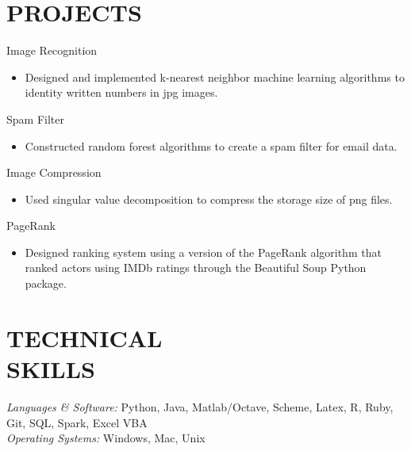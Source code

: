 \documentclass[margin, 8pt]{res} %
\begin{document}
\begin{resume}

\section{PROJECTS}Image Recognition
		\begin{itemize} \itemsep -2pt
		\item Designed and implemented k-nearest neighbor machine learning algorithms to identity written numbers in jpg images.
		\end{itemize}
		Spam Filter
		\begin{itemize} \itemsep -2pt
		\item Constructed random forest algorithms to create a spam filter for email data.
		\end{itemize}
		Image Compression
		\begin{itemize} \itemsep -2pt
		\item Used singular value decomposition to compress the storage size of png files.
		\end{itemize}
		PageRank
		\begin{itemize} \itemsep -2pt
		\item Designed ranking system using a version of the PageRank algorithm that ranked actors using IMDb ratings through the Beautiful Soup Python package.
		\end{itemize}

\section{TECHNICAL \\ SKILLS} {\sl Languages \& Software:} Python, Java, Matlab/Octave, 
         Scheme, Latex, R, Ruby, Git, SQL, Spark, Excel VBA\\
                {\sl Operating Systems:} Windows, Mac, Unix\\
								

\end{resume}
\end{document}
